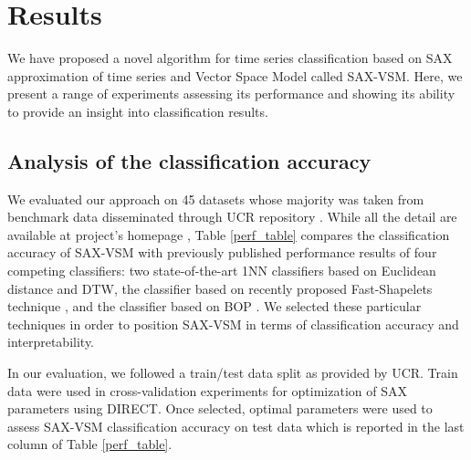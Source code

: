 \documentclass[conference]{IEEEtran}
\begin{document}
\section{Results} \label{results}
We have proposed a novel algorithm for time series classification based on SAX
approximation of time series and Vector Space Model called SAX-VSM. 
Here, we present a range of experiments assessing its performance and showing
its ability to provide an insight into classification results.

\subsection{Analysis of the classification accuracy}
We evaluated our approach on 45 datasets whose majority was taken from benchmark 
data disseminated through UCR repository \cite{ucr}. While all the detail are available at 
project's homepage \cite{jmotif}, Table \ref{perf_table} compares the classification accuracy 
of SAX-VSM with previously published performance results of four competing classifiers: 
two state-of-the-art 1NN classifiers based on Euclidean distance and DTW, 
the classifier based on recently proposed Fast-Shapelets technique \cite{fast-shapelets}, 
and the classifier based on BOP \cite{bag_patterns}.
We selected these particular techniques in order to position SAX-VSM in terms of 
classification accuracy and interpretability. 

In our evaluation, we followed a train/test data split as provided by UCR. 
Train data were used in cross-validation experiments for optimization of 
SAX parameters using \mbox{DIRECT}. 
Once selected, optimal parameters were used to assess SAX-VSM classification 
accuracy on test data which is reported in the last column of Table \ref{perf_table}.
\end{document}
